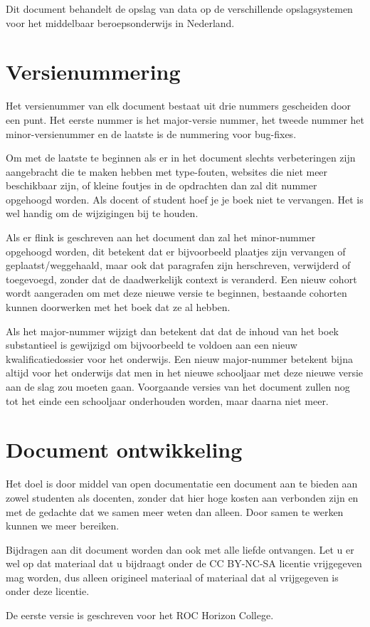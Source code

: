 Dit document behandelt de opslag van data op de verschillende opslagsystemen voor het middelbaar beroepsonderwijs in Nederland.

\section*{Versienummering}
Het versienummer van elk document bestaat uit drie nummers gescheiden door een punt. Het eerste nummer is het major-versie nummer, het tweede nummer het minor-versienummer en de laatste is de nummering voor bug-fixes.\par
Om met de laatste te beginnen als er in het document slechts verbeteringen zijn aangebracht die te maken hebben met type-fouten, websites die niet meer beschikbaar zijn, of kleine foutjes in de opdrachten dan zal dit nummer opgehoogd worden. Als docent of student hoef je je boek niet te vervangen. Het is wel handig om de wijzigingen bij te houden.\par
Als er flink is geschreven aan het document dan zal het minor-nummer opgehoogd worden, dit betekent dat er bijvoorbeeld plaatjes zijn vervangen of geplaatst/weggehaald, maar ook dat paragrafen zijn herschreven, verwijderd of toegevoegd, zonder dat de daadwerkelijk context is veranderd. Een nieuw cohort wordt aangeraden om met deze nieuwe versie te beginnen, bestaande cohorten kunnen doorwerken met het boek dat ze al hebben.\par
Als het major-nummer wijzigt dan betekent dat dat de inhoud van het boek substantieel is gewijzigd om bijvoorbeeld te voldoen aan een nieuw kwalificatiedossier voor het onderwijs. Een nieuw major-nummer betekent bijna altijd voor het onderwijs dat men in het nieuwe schooljaar met deze nieuwe versie aan de slag zou moeten gaan. Voorgaande versies van het document zullen nog tot het einde een schooljaar onderhouden worden, maar daarna niet meer.

\section*{Document ontwikkeling}
Het doel is door middel van open documentatie een document aan te bieden aan zowel studenten als docenten, zonder dat hier hoge kosten aan verbonden zijn en met de gedachte dat we samen meer weten dan alleen. Door samen te werken kunnen we meer bereiken.\par
Bijdragen aan dit document worden dan ook met alle liefde ontvangen. Let u er wel op dat materiaal dat u bijdraagt onder de CC BY-NC-SA licentie vrijgegeven mag worden, dus alleen origineel materiaal of materiaal dat al vrijgegeven is onder deze licentie.\par
De eerste versie is geschreven voor het ROC Horizon College.
